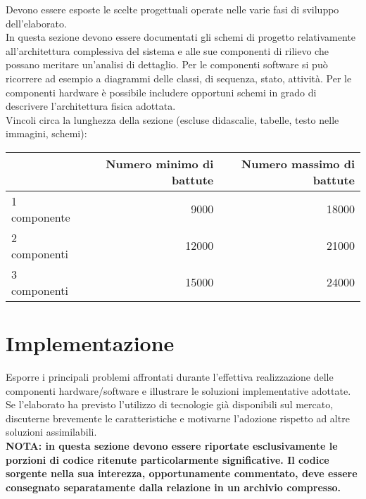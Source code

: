 \documentclass[12pt]{article}
\begin{document}
Devono essere esposte le scelte progettuali operate nelle varie fasi di sviluppo dell'elaborato.\\

In questa sezione devono essere documentati gli schemi di progetto relativamente all'architettura complessiva del sistema e alle sue componenti di rilievo che possano meritare un'analisi di dettaglio. Per le componenti software si può ricorrere ad esempio a diagrammi delle classi, di sequenza, stato, attività. Per le componenti hardware è possibile includere opportuni schemi in grado di descrivere l'architettura fisica adottata.\\

Vincoli circa la lunghezza della sezione (escluse didascalie, tabelle, testo nelle immagini, schemi):

\vspace{1cm}
\begin{tabular}{l|rr}
 & Numero minimo di battute & Numero massimo di battute \\
 \hline
 1 componente & 9000 & 18000 \\
 2 componenti & 12000 & 21000 \\
 3 componenti & 15000 & 24000 \\
 \hline
\end{tabular}


\newpage



\section{Implementazione}\label{sec:implementazione}

Esporre i principali problemi affrontati durante l'effettiva realizzazione delle componenti hardware/software e illustrare le soluzioni implementative adottate. Se l'elaborato ha previsto l'utilizzo di tecnologie già disponibili sul mercato, discuterne brevemente le caratteristiche e motivarne l'adozione rispetto ad altre soluzioni assimilabili.\\

\textbf{NOTA: in questa sezione devono essere riportate esclusivamente le porzioni di codice ritenute particolarmente significative. Il codice sorgente nella sua interezza, opportunamente commentato, deve essere consegnato separatamente dalla relazione in un archivio compresso.}\\
\end{document}
